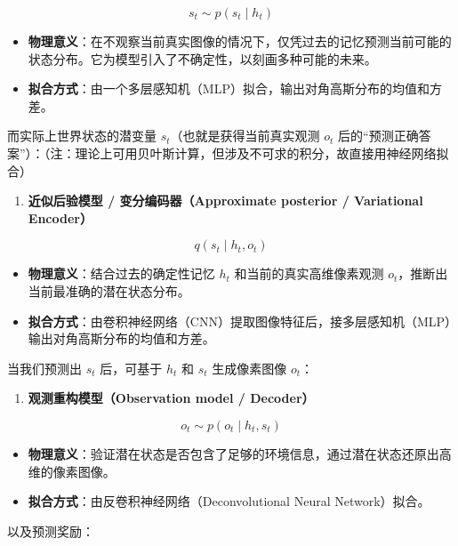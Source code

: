\[
s_t \sim p(s_t \mid h_t)
\]

\begin{itemize}
\tightlist
\item
  \textbf{物理意义}：在不观察当前真实图像的情况下，仅凭过去的记忆预测当前可能的状态分布。它为模型引入了不确定性，以刻画多种可能的未来。
\item
  \textbf{拟合方式}：由一个多层感知机（MLP）拟合，输出对角高斯分布的均值和方差。
\end{itemize}

而实际上世界状态的潜变量 \(s_t\)（也就是获得当前真实观测 \(o_t\) 后的``预测正确答案''）：（注：理论上可用贝叶斯计算，但涉及不可求的积分，故直接用神经网络拟合）

\begin{enumerate}
\def\labelenumi{\arabic{enumi}.}
\setcounter{enumi}{2}
\tightlist
\item
  \textbf{近似后验模型 / 变分编码器（Approximate posterior / Variational Encoder）}
\end{enumerate}

\[
q(s_t \mid h_t, o_t)
\]

\begin{itemize}
\tightlist
\item
  \textbf{物理意义}：结合过去的确定性记忆 \(h_t\) 和当前的真实高维像素观测 \(o_t\)，推断出当前最准确的潜在状态分布。
\item
  \textbf{拟合方式}：由卷积神经网络（CNN）提取图像特征后，接多层感知机（MLP）输出对角高斯分布的均值和方差。
\end{itemize}

当我们预测出 \(s_t\) 后，可基于 \(h_t\) 和 \(s_t\) 生成像素图像 \(o_t\)：

\begin{enumerate}
\def\labelenumi{\arabic{enumi}.}
\setcounter{enumi}{3}
\tightlist
\item
  \textbf{观测重构模型（Observation model / Decoder）}
\end{enumerate}

\[
o_t \sim p(o_t \mid h_t, s_t)
\]

\begin{itemize}
\tightlist
\item
  \textbf{物理意义}：验证潜在状态是否包含了足够的环境信息，通过潜在状态还原出高维的像素图像。
\item
  \textbf{拟合方式}：由反卷积神经网络（Deconvolutional Neural Network）拟合。
\end{itemize}

以及预测奖励：

